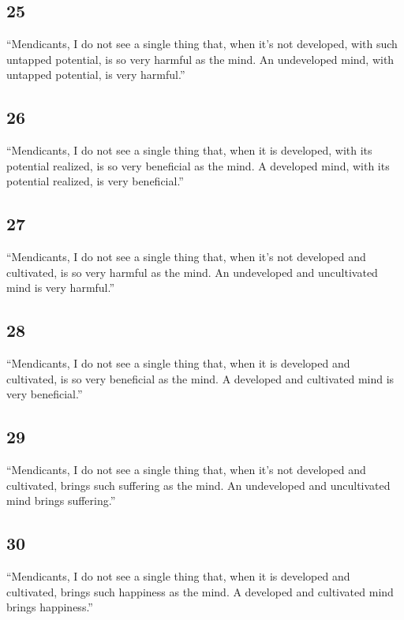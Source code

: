 \documentclass[12pt,openany]{book}%
\begin{document}
\subsection*{25 }

“Mendicants, I do not see a single thing that, when it’s not developed, with such untapped potential, is so very harmful as the mind. An undeveloped mind, with untapped potential, is very harmful.” 

\subsection*{26 }

“Mendicants, I do not see a single thing that, when it is developed, with its potential realized, is so very beneficial as the mind. A developed mind, with its potential realized, is very beneficial.” 

\subsection*{27 }

“Mendicants, I do not see a single thing that, when it’s not developed and cultivated, is so very harmful as the mind. An undeveloped and uncultivated mind is very harmful.” 

\subsection*{28 }

“Mendicants, I do not see a single thing that, when it is developed and cultivated, is so very beneficial as the mind. A developed and cultivated mind is very beneficial.” 

\subsection*{29 }

“Mendicants, I do not see a single thing that, when it’s not developed and cultivated, brings such suffering as the mind. An undeveloped and uncultivated mind brings suffering.” 

\subsection*{30 }

“Mendicants, I do not see a single thing that, when it is developed and cultivated, brings such happiness as the mind. A developed and cultivated mind brings happiness.” 
\end{document}
